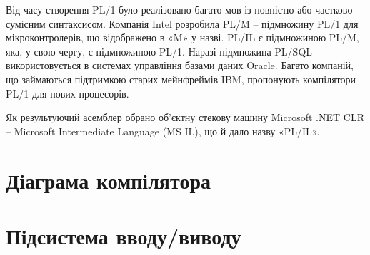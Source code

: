 \documentclass{memoir}
\begin{document}
Від часу створення PL/1 було реалізовано багато мов із повністю або частково сумісним синтаксисом. Компанія Intel розробила PL/M – підмножину PL/1 для мікроконтролерів, що відображено в «M» у назві. PL/IL є підмножиною PL/M, яка, у свою чергу, є підмножиною PL/1. Наразі підмножина PL/SQL використовується в системах управління базами даних Oracle. Багато компаній, що займаються підтримкою старих мейнфреймів IBM, пропонують компілятори PL/1 для нових процесорів.

Як результуючий асемблер обрано об’єктну стекову машину Microsoft .NET CLR – Microsoft Intermediate Language (MS IL), що й дало назву «PL/IL».

\newpage
\section{Діаграма компілятора}


\section{Підсистема вводу/виводу}
\end{document}
